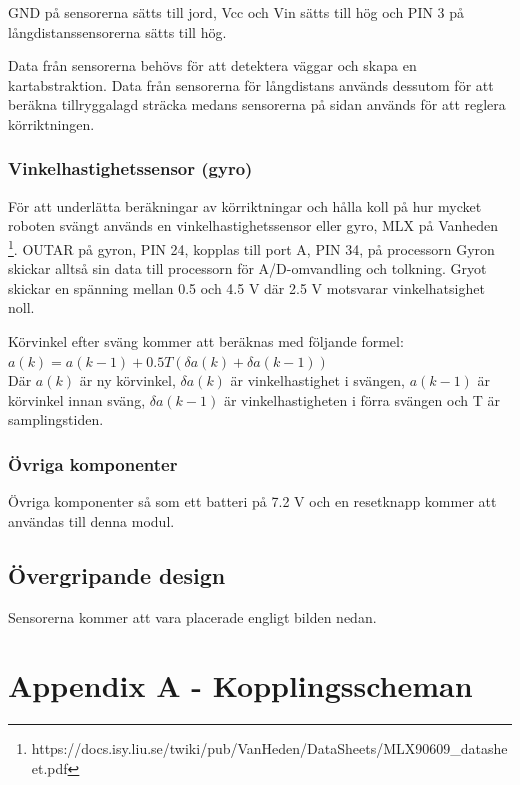 \documentclass[a4paper,12pt,fleqn]{article}
\begin{document}
GND på sensorerna sätts till jord, Vcc och Vin sätts till hög och PIN 3 på långdistanssensorerna sätts till hög.
 
Data från sensorerna behövs för att detektera väggar och skapa en kartabstraktion. Data från sensorerna för långdistans används dessutom för att beräkna tillryggalagd sträcka medans sensorerna på sidan används för att reglera körriktningen.

\subsubsection{Vinkelhastighetssensor (gyro)}
För att underlätta beräkningar av körriktningar och hålla koll på hur mycket roboten svängt används en vinkelhastighetssensor eller gyro, MLX på Vanheden \footnote{https://docs.isy.liu.se/twiki/pub/VanHeden/DataSheets/MLX90609\_datasheet.pdf}. OUTAR på gyron, PIN 24, kopplas till port A, PIN 34, på processorn Gyron skickar alltså sin data till processorn för A/D-omvandling och tolkning. Gryot skickar en spänning mellan 0.5 och 4.5 V där 2.5 V motsvarar vinkelhatsighet noll.

Körvinkel efter sväng kommer att beräknas med följande formel: \newline
$ a(k) = a(k-1)+0.5T(\delta a(k)+\delta a(k-1))$ \\
Där $a(k)$ är ny körvinkel, $\delta a(k)$ är vinkelhastighet i svängen, $a(k-1)$ är körvinkel innan sväng, $\delta a(k-1)$ är vinkelhastigheten i förra svängen och T är samplingstiden.

\subsubsection{Övriga komponenter}
Övriga komponenter så som ett batteri på 7.2 V och en resetknapp kommer att användas till denna modul.

\subsection{Övergripande design}
Sensorerna kommer att vara placerade engligt bilden nedan.


\newpage
\appendix
\pagestyle{empty}
\section{Appendix A - Kopplingsscheman}
\end{document}
